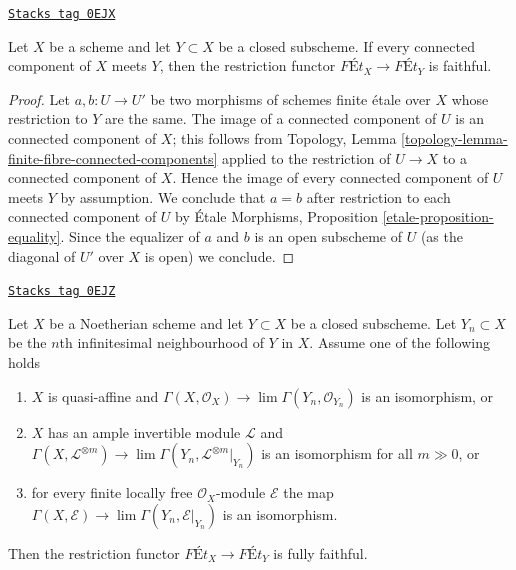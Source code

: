 \begin{lemma}
\label{pione-lemma-restriction-faithful}
\href{https://stacks.math.columbia.edu/tag/0EJX}{\texttt{Stacks tag 0EJX}}

Let $X$ be a scheme and let $Y \subset X$ be a closed subscheme.
If every connected component of $X$ meets $Y$, then
the restriction functor $\textit{F\'Et}_X \to \textit{F\'Et}_Y$
is faithful.
\end{lemma}

\begin{proof}
Let $a, b : U \to U'$ be two morphisms of schemes finite \'etale over $X$
whose restriction to $Y$ are the same. The image of a connected component
of $U$ is an connected component of $X$; this follows from
Topology, Lemma \ref{topology-lemma-finite-fibre-connected-components}
applied to the restriction of $U \to X$ to a connected component of $X$.
Hence the image of every connected component of $U$ meets $Y$
by assumption. We conclude that $a = b$ after restriction to each
connected component of $U$ by \'Etale Morphisms, Proposition
\ref{etale-proposition-equality}. Since the equalizer of $a$ and $b$
is an open subscheme of $U$ (as the diagonal of $U'$ over $X$ is open)
we conclude.
\end{proof}

\begin{lemma}
\label{pione-lemma-restriction-fully-faithful-special}
\href{https://stacks.math.columbia.edu/tag/0EJZ}{\texttt{Stacks tag 0EJZ}}

Let $X$ be a Noetherian scheme and let $Y \subset X$ be a closed subscheme.
Let $Y_n \subset X$ be the $n$th infinitesimal neighbourhood of $Y$ in $X$.
Assume one of the following holds
\begin{enumerate}
\item $X$ is quasi-affine and
$\Gamma(X, \mathcal{O}_X) \to \lim \Gamma(Y_n, \mathcal{O}_{Y_n})$
is an isomorphism, or
\item $X$ has an ample invertible module $\mathcal{L}$ and
$\Gamma(X, \mathcal{L}^{\otimes m}) \to
\lim \Gamma(Y_n, \mathcal{L}^{\otimes m}|_{Y_n})$
is an isomorphism for all $m \gg 0$, or
\item for every finite locally free $\mathcal{O}_X$-module
$\mathcal{E}$ the map
$\Gamma(X, \mathcal{E}) \to \lim \Gamma(Y_n, \mathcal{E}|_{Y_n})$
is an isomorphism.
\end{enumerate}
Then the restriction functor $\textit{F\'Et}_X \to \textit{F\'Et}_Y$
is fully faithful.
\end{lemma}

